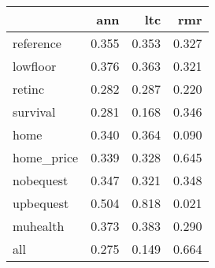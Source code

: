 \begin{tabular}{lrrr}
\toprule
{} &    ann &    ltc &    rmr \\
\midrule
reference  &  0.355 &  0.353 &  0.327 \\
lowfloor   &  0.376 &  0.363 &  0.321 \\
retinc     &  0.282 &  0.287 &  0.220 \\
survival   &  0.281 &  0.168 &  0.346 \\
home       &  0.340 &  0.364 &  0.090 \\
home\_price &  0.339 &  0.328 &  0.645 \\
nobequest  &  0.347 &  0.321 &  0.348 \\
upbequest  &  0.504 &  0.818 &  0.021 \\
muhealth   &  0.373 &  0.383 &  0.290 \\
all        &  0.275 &  0.149 &  0.664 \\
\bottomrule
\end{tabular}
